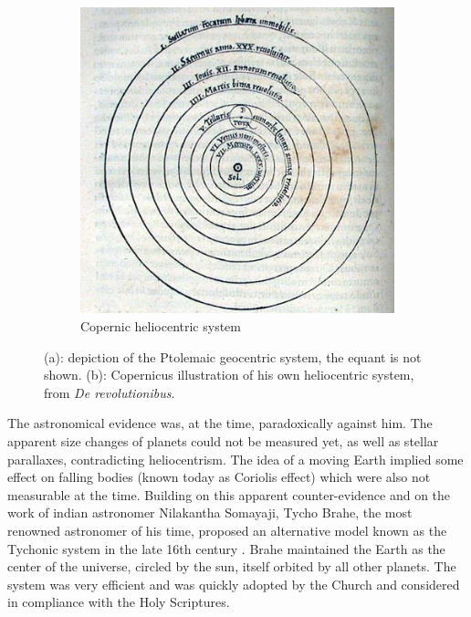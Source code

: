 \begin{figure}
\begin{subfigure}[b]{0.48\textwidth}
    	\includegraphics[width=\linewidth]{Figures/0_CopernicusModel.jpg}
        \caption{Copernic heliocentric system}
        \label{Fig:0_copernicsystem}
    \end{subfigure}
\caption[Ptolemaic and Copernic's systems]{(a): depiction of the Ptolemaic geocentric system, the equant is not shown. (b): Copernicus illustration of his own heliocentric system, from \textit{De revolutionibus}.}
\label{Fig:0_heliogeo}
\end{figure}



The astronomical evidence was, at the time, paradoxically against him. The apparent size changes of planets could not be measured yet, as well as stellar parallaxes, contradicting heliocentrism. The idea of a moving Earth implied some effect on falling bodies (known today as Coriolis effect) which were also not measurable at the time. Building on this apparent counter-evidence and on the work of indian astronomer Nilakantha Somayaji, Tycho Brahe, the most renowned astronomer of his time, proposed an alternative model known as the Tychonic system in the late 16th century \citep{ramasubramanian1998}. Brahe maintained the Earth as the center of the universe, circled by the sun, itself orbited by all other planets. The system was very efficient and was quickly adopted by the Church and considered in compliance with the Holy Scriptures.

